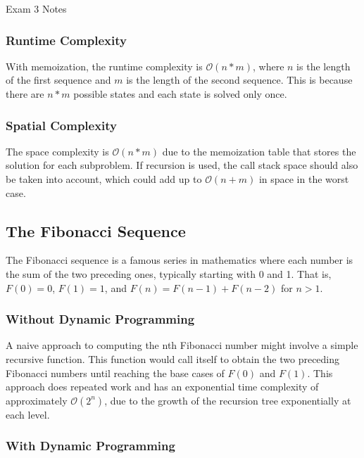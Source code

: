 \begin{examnotes}{Exam 3 Notes}
\begin{highlight}
        \subsubsection*{Runtime Complexity}

        With memoization, the runtime complexity is $\mathcal{O}(n*m)$, where $n$ is the length of the first sequence and $m$ is the length of the second sequence. This is because there are $n*m$ 
        possible states and each state is solved only once. \vspace*{1em}

        \subsubsection*{Spatial Complexity}

        The space complexity is $\mathcal{O}(n*m)$ due to the memoization table that stores the solution for each subproblem. If recursion is used, the call stack space should also be taken into 
        account, which could add up to $\mathcal{O}(n+m)$ in space in the worst case.
    \end{highlight}

    \subsection*{The Fibonacci Sequence}

    The Fibonacci sequence is a famous series in mathematics where each number is the sum of the two preceding ones, typically starting with 0 and 1. That is, $F(0)=0$, $F(1)=1$, and $F(n)=F(n-1)+F(n-2)$ 
    for $n > 1$.

    \subsubsection*{Without Dynamic Programming}

    A naive approach to computing the nth Fibonacci number might involve a simple recursive function. This function would call itself to obtain the two preceding Fibonacci numbers until reaching the 
    base cases of $F(0)$ and $F(1)$. This approach does repeated work and has an exponential time complexity of approximately $\mathcal{O}(2^n)$, due to the growth of the recursion tree exponentially 
    at each level.

    \subsubsection*{With Dynamic Programming}


\end{examnotes}
